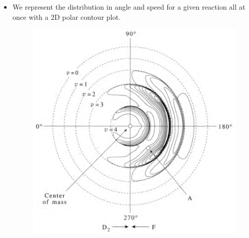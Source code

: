 \documentclass[../notes.tex]{subfiles}
\begin{document}
\begin{itemize}
\begin{figure}[h!]
        \caption{ speed distribution.}
        \label{fig:DFspeeds}
    \end{figure}
    \begin{itemize}
        \item Additionally, as per the previous example,  can be produced in vibrational states zero through four.
        \item \textcite{bib:McQuarrieSimon} does a worked example, showing quantitatively how the speed of the  molecule depends on its vibrational state.
        \item Experimentally, these results show up as separate peaks, each corresponding to a vibrational energy level, in Figure \ref{fig:DFspeeds}, which gives the collision frequency of  molecules with the detector over time.
        \begin{itemize}
            \item Notice that the molecules with the least vibrational energy have the most translational energy, and hence move the fastest and appear first.
        \end{itemize}
    \end{itemize}
    \item {}We represent the distribution in angle and speed for a given reaction all at once with a 2D polar contour plot.
    \begin{figure}[h!]
        \centering
        \includegraphics[width=0.53\linewidth]{../ExtFiles/ContourPlotFD2.png}

\end{figure}
\end{itemize}
\end{document}
